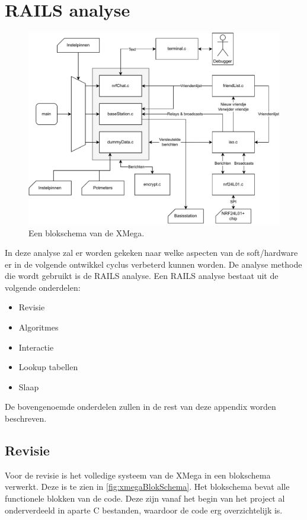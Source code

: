 \section{RAILS analyse} \label{app:railsAnalysis}

\begin{figure}[ht]
    \centering
    \includegraphics[width=\textwidth]{img/xmegablokshema}
    \caption{Een blokschema van de XMega.}
    \label{fig:xmegaBlokSchema}
\end{figure}

\noindent
In deze analyse zal er worden gekeken naar welke aspecten van de soft/hardware er in de volgende ontwikkel cyclus verbeterd kunnen worden. De analyse methode die wordt gebruikt is de RAILS analyse. Een RAILS analyse bestaat uit de volgende onderdelen:
\begin{itemize}
    \item Revisie
    \item Algoritmes
    \item Interactie
    \item Lookup tabellen
    \item Slaap
\end{itemize}
De bovengenoemde onderdelen zullen in de rest van deze appendix worden beschreven.

\subsection{Revisie}

Voor de revisie is het volledige systeem van de XMega in een blokschema verwerkt. Deze is te zien in \autoref{fig:xmegaBlokSchema}. Het blokschema bevat alle functionele blokken van de code. Deze zijn vanaf het begin van het project al onderverdeeld in aparte C bestanden, waardoor de code erg overzichtelijk is.


